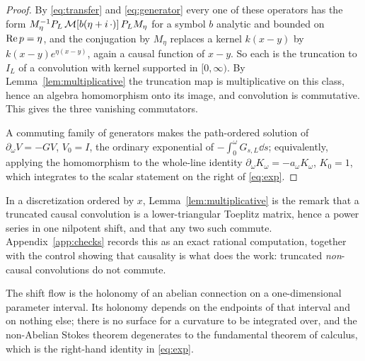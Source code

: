 \begin{proof}
By \eqref{eq:transfer} and \eqref{eq:generator} every one of these operators has
the form $M_\eta^{-1}P_L\,\mathcal M[b(\eta+i\,\cdot)]\,P_LM_\eta$ for a symbol $b$
analytic and bounded on $\operatorname{Re} p=\eta$, and the conjugation by $M_\eta$ replaces a
kernel $k(x-y)$ by $k(x-y)e^{\eta(x-y)}$, again a causal function of $x-y$. So
each is the truncation to $I_L$ of a convolution with kernel supported in
$[0,\infty)$. By Lemma~\ref{lem:multiplicative} the truncation map is
multiplicative on this class, hence an algebra homomorphism onto its image, and
convolution is commutative. This gives the three vanishing commutators.

A commuting family of generators makes the path-ordered solution of
$\partial_\omega V=-GV$, $V_0=I$, the ordinary exponential of
$-\int_0^\omega G_{s,L}\dd s$; equivalently, applying the homomorphism to the
whole-line identity $\partial_\omega K_\omega=-a_\omega K_\omega$, $K_0=1$, which
integrates to the scalar statement on the right of \eqref{eq:exp}.
\end{proof}

\begin{remark}\label{rem:toeplitz}
In a discretization ordered by $x$, Lemma~\ref{lem:multiplicative} is the remark
that a truncated causal convolution is a lower-triangular Toeplitz matrix, hence
a power series in one nilpotent shift, and that any two such commute.
Appendix~\ref{app:checks} records this as an exact rational computation, together
with the control showing that causality is what does the work: truncated
\emph{non}-causal convolutions do not commute.
\end{remark}

\begin{corollary}\label{cor:stokes}
The shift flow is the holonomy of an abelian connection on a one-dimensional
parameter interval. Its holonomy depends on the endpoints of that interval and on
nothing else; there is no surface for a curvature to be integrated over, and the
non-Abelian Stokes theorem degenerates to the fundamental theorem of calculus,
which is the right-hand identity in \eqref{eq:exp}.
\end{corollary}

